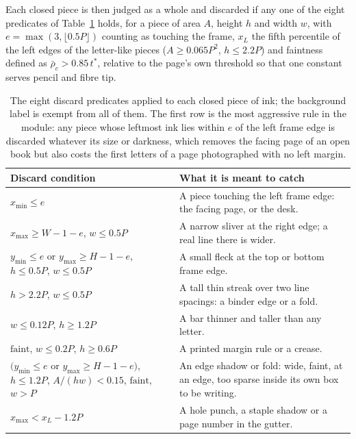 Each closed piece is then judged as a whole and discarded if any one of the eight predicates of Table~\ref{tab:seg-artifact} holds, for a piece of area $A$, height $h$ and width $w$, with $e=\max(3,\lfloor0.5P\rfloor)$ counting as touching the frame, $x_L$ the fifth percentile of the left edges of the letter-like pieces ($A\ge0.065P^2$, $h\le2.2P$) and faintness defined as $\bar\rho_c>0.85\,t^*$, relative to the page's own threshold so that one constant serves pencil and fibre tip.

\begin{table}[h]
\centering
\fontsize{8.5}{10.2}\selectfont
\setlength{\tabcolsep}{4pt}
\begin{tabularx}{\linewidth}{|p{3.3cm}|X|}
\hline
\textbf{Discard condition} & \textbf{What it is meant to catch} \\
\hline
$x_{\min}\le e$ & A piece touching the left frame edge: the facing page, or the desk. \\
\hline
$x_{\max}\ge W-1-e$, $w\le0.5P$ & A narrow sliver at the right edge; a real line there is wider. \\
\hline
$y_{\min}\le e$ or $y_{\max}\ge H-1-e$, $h\le0.5P$, $w\le0.5P$ & A small fleck at the top or bottom frame edge. \\
\hline
$h>2.2P$, $w\le0.5P$ & A tall thin streak over two line spacings: a binder edge or a fold. \\
\hline
$w\le0.12P$, $h\ge1.2P$ & A bar thinner and taller than any letter. \\
\hline
$\mathrm{faint}$, $w\le0.2P$, $h\ge0.6P$ & A printed margin rule or a crease. \\
\hline
$(y_{\min}\le e$ or $y_{\max}\ge H-1-e)$, $h\le1.2P$, $A/(hw)<0.15$, $\mathrm{faint}$, $w>P$ & An edge shadow or fold: wide, faint, at an edge, too sparse inside its own box to be writing. \\
\hline
$x_{\max}<x_L-1.2P$ & A hole punch, a staple shadow or a page number in the gutter. \\
\hline
\end{tabularx}
\caption{The eight discard predicates applied to each closed piece of ink; the background label is exempt from all of them. The first row is the most aggressive rule in the module: any piece whose leftmost ink lies within $e$ of the left frame edge is discarded whatever its size or darkness, which removes the facing page of an open book but also costs the first letters of a page photographed with no left margin.}
\label{tab:seg-artifact}
\end{table}

